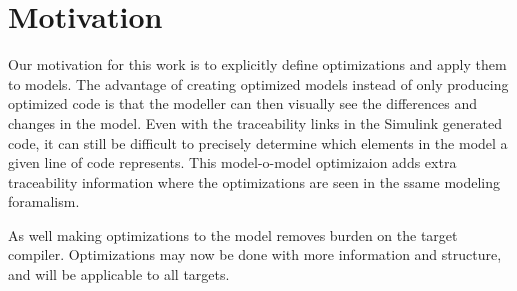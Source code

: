 \section{Motivation}
Our motivation for this work is to explicitly define optimizations and apply them to models. The advantage of creating optimized models instead of only producing optimized code is that the modeller can then visually see the differences and changes in the model. Even with the traceability links in the Simulink generated code, it can still be difficult to precisely determine which elements in the model a given line of code represents. This model-o-model optimizaion adds extra traceability information where the optimizations are seen in the ssame modeling foramalism.


As well making optimizations to the model removes burden on the target compiler. Optimizations may now be done with more information and structure, and will be applicable to all targets.
